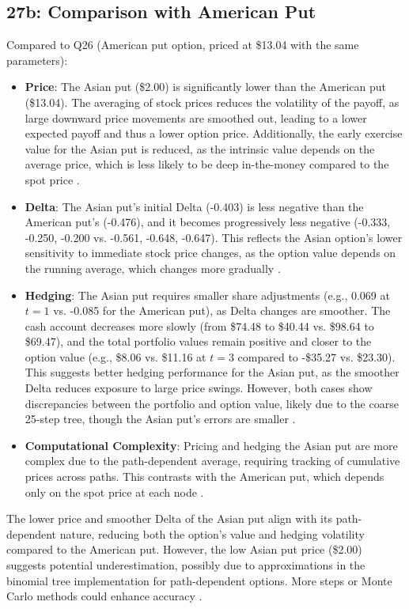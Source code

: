 \documentclass{article}
\begin{document}
\subsection*{27b: Comparison with American Put}

Compared to Q26 (American put option, priced at \$13.04 with the same parameters):
\begin{itemize}
    \item \textbf{Price}: The Asian put (\$2.00) is significantly lower than the American put (\$13.04). The averaging of stock prices reduces the volatility of the payoff, as large downward price movements are smoothed out, leading to a lower expected payoff and thus a lower option price. Additionally, the early exercise value for the Asian put is reduced, as the intrinsic value depends on the average price, which is less likely to be deep in-the-money compared to the spot price \citep{hull2018options}.
    \item \textbf{Delta}: The Asian put’s initial Delta (-0.403) is less negative than the American put’s (-0.476), and it becomes progressively less negative (-0.333, -0.250, -0.200 vs. -0.561, -0.648, -0.647). This reflects the Asian option’s lower sensitivity to immediate stock price changes, as the option value depends on the running average, which changes more gradually \citep{shreve2004stochastic}.
    \item \textbf{Hedging}: The Asian put requires smaller share adjustments (e.g., 0.069 at $t=1$ vs. -0.085 for the American put), as Delta changes are smoother. The cash account decreases more slowly (from \$74.48 to \$40.44 vs. \$98.64 to \$69.47), and the total portfolio values remain positive and closer to the option value (e.g., \$8.06 vs. \$11.16 at $t=3$ compared to -\$35.27 vs. \$23.30). This suggests better hedging performance for the Asian put, as the smoother Delta reduces exposure to large price swings. However, both cases show discrepancies between the portfolio and option value, likely due to the coarse 25-step tree, though the Asian put’s errors are smaller \citep{hull2018options}.
    \item \textbf{Computational Complexity}: Pricing and hedging the Asian put are more complex due to the path-dependent average, requiring tracking of cumulative prices across paths. This contrasts with the American put, which depends only on the spot price at each node \citep{shreve2004stochastic}.
\end{itemize}

The lower price and smoother Delta of the Asian put align with its path-dependent nature, reducing both the option’s value and hedging volatility compared to the American put. However, the low Asian put price (\$2.00) suggests potential underestimation, possibly due to approximations in the binomial tree implementation for path-dependent options. More steps or Monte Carlo methods could enhance accuracy \citep{hull2018options, shreve2004stochastic}.




\end{document}
